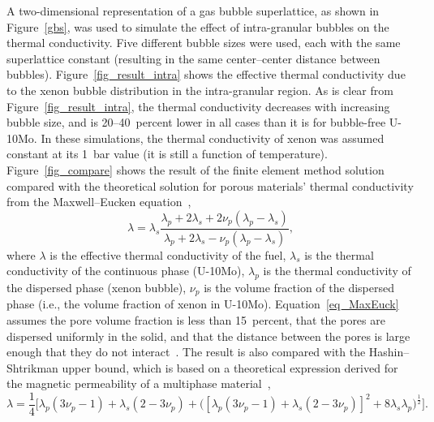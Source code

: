 A two-dimensional representation of a gas bubble superlattice, as shown in
Figure~\ref{gbs}, was used to simulate the effect of intra-granular bubbles on the thermal conductivity.
Five different bubble sizes were used, each with the same superlattice
constant (resulting in the same center--center distance between bubbles).
Figure~\ref{fig_result_intra} shows the effective thermal conductivity due to the xenon bubble distribution in the intra-granular region.
As is clear from Figure~\ref{fig_result_intra}, the thermal conductivity decreases with increasing bubble size, and is 20--40~percent lower in all cases than it is for bubble-free U-10Mo. In these simulations, the thermal conductivity of xenon was assumed constant at its 1~bar value (it is still a function of temperature).
Figure~\ref{fig_compare} shows the result of the finite element method solution compared with the theoretical solution for porous materials' thermal conductivity from the Maxwell--Eucken equation~\cite{maxwell1881treatise}, 
\begin{equation}
	\lambda = \lambda_s\frac{\lambda_p+2\lambda_s+2\nu_p(\lambda_p-\lambda_s)}{\lambda_p+2\lambda_s-\nu_p(\lambda_p-\lambda_s)},
	\label{eq_MaxEuck}
\end{equation}
where $\lambda$ is the effective thermal conductivity of the fuel, $\lambda_s$ is the thermal conductivity of the continuous phase (U-10Mo), $\lambda_p$ is the thermal conductivity of the dispersed phase (xenon bubble), $\nu_p$ is the volume fraction of the dispersed phase (i.e., the volume fraction of xenon in U-10Mo). Equation~\eqref{eq_MaxEuck} assumes the pore volume fraction is less than 15~percent, that the pores are dispersed uniformly in the solid, and that the distance between the pores is large enough that they do not interact~\cite{clark2003monolithic,smith2013thermal}. The result is also compared with the Hashin--Shtrikman upper bound, which is based on a theoretical expression derived for the magnetic permeability of a multiphase material~\cite{hashin1962variational},
\begin{equation}
\lambda = \frac{1}{4}\biggl[ \lambda_p(3\nu_p-1) + \lambda_s(2-3\nu_p) + \bigg( \left[ \lambda_p (3\nu_p -1) + \lambda_s(2-3\nu_p) \right]^2 + 8\lambda_s\lambda_p \bigg)^{\frac{1}{2}}
    \biggr].
\label{eq:Hash-Sht}
\end{equation}

